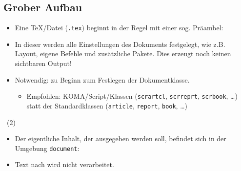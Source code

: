 \subsection{Grober Aufbau}

\begin{frame}{\subsecname}
    \begin{itemize}
        \item Eine \TeX\-/Datei (\texttt{.tex}) beginnt in der Regel mit einer sog.
            \alert{Präambel}:
        \item In dieser werden alle Einstellungen des Dokuments festgelegt, wie z.B. Layout, eigene
            Befehle und zusätzliche Pakete. Dies erzeugt noch keinen sichtbaren Output!
        \item Notwendig:  zu Beginn zum Festlegen der
            \alert{Dokumentklasse}.
            \begin{itemize}
                \item Empfohlen: KOMA\-/Script\-/Klassen (\texttt{scrartcl}, \texttt{scrreprt},
                    \texttt{scrbook}, \dots) statt der Standardklassen (\texttt{article},
                    \texttt{report}, \texttt{book}, \dots)
            \end{itemize}
    \end{itemize}
\end{frame}

\begin{frame}{\subsecname~(2)}
    \begin{itemize}
        \item Der eigentliche Inhalt, der ausgegeben werden soll, befindet sich in der Umgebung
            \texttt{document}:
        \item Text nach  wird nicht verarbeitet.
    \end{itemize}
\end{frame}
